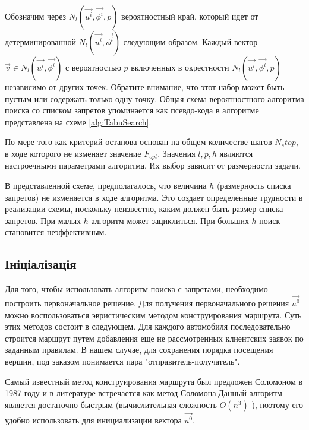 \documentclass[]{TAACpaper}
\begin{document}
Обозначим через $N_l(\vec{u^i},\vec{\phi^i},p)$ вероятностный край, который идет от детерминированной $N_l(\vec{u^i},\vec{\phi^i})$ следующим образом. Каждый вектор $\vec{v} \in N_l(\vec{u^i},\vec{\phi^i})$ с вероятностью $p$ включенных в окрестности $N_l(\vec{u^i},\vec{\phi^i},p)$ независимо от других точек. Обратите внимание, что этот набор может быть пустым или содержать только одну точку. Общая схема вероятностного алгоритма поиска со списком запретов упоминается как псевдо-кода в алгоритме \\
представлена на схеме \ref{alg:TabuSearch}.

По мере того как критерий останова основан на общем количестве шагов  $N_stop$,  в ходе которого не изменяет значение $F_{opt}$. Значения $l,p,h$ являются настроечными параметрами алгоритма. Их выбор зависит от размерности задачи.

В представленной схеме, предполагалось, что величина $h$ (размерность списка запретов)  не изменяется в ходе алгоритма. Это создает определенные трудности в реализации схемы, поскольку неизвестно, каким должен быть размер списка запретов. При малых $h$ алгоритм может зациклиться. При больших  $h$ поиск становится неэффективным. 

\subsection{Ініціалізація}
Для того, чтобы использовать алгоритм поиска с запретами, необходимо построить первоначальное решение. Для получения первоначального решения $\vec{u^0}$ можно воспользоваться эвристическим методом конструирования маршрута. Суть этих методов состоит в следующем. Для каждого автомобиля последовательно строится маршрут путем добавления еще не рассмотренных клиентских заявок по заданным правилам. В нашем случае, для сохранения порядка посещения вершин, под заказом понимается пара "отправитель-получатель".

Самый известный метод конструирования маршрута был предложен Соломоном в 1987 году \cite{Cordeau2001,Braysy} и в литературе встречается как метод Соломона.Данный алгоритм является достаточно быстрым (вычислительная сложность $O(n^3)$ \cite{Babb}), поэтому его удобно использовать для инициализации вектора $\vec{u^0}$.
\end{document}
